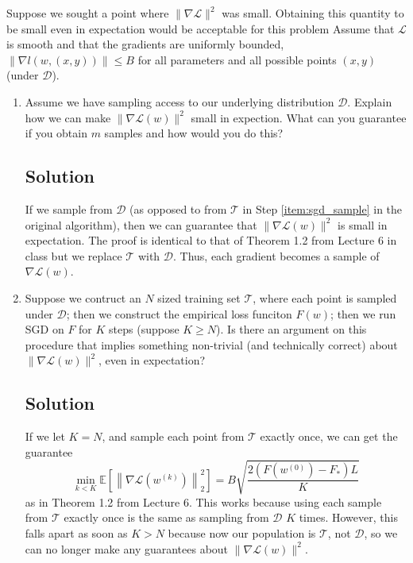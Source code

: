 \documentclass[letterpaper,11pt]{article}
\begin{document}
Suppose we sought a point where $\lVert \nabla \mathcal{L} \rVert^2$ was
small. Obtaining this quantity to be small even in expectation would be
acceptable for this problem Assume that $\mathcal{L}$ is smooth and that the
gradients are uniformly bounded,
$\lVert \nabla l\left(w, (x,y)\right)\rVert \leq B$ for all parameters and all
possible points $(x,y)$ (under $\mathcal{D}$).

\begin{enumerate}
\item Assume we have sampling access to our underlying distribution
  $\mathcal{D}$. Explain how we can make $\lVert \nabla \mathcal{L}(w) \rVert^2$
  small in expection. What can you guarantee if you obtain $m$ samples and how
  would you do this?

  \subsection*{Solution}

  If we sample from $\mathcal{D}$ (as opposed to from $\mathcal{T}$ in Step
  \ref{item:sgd_sample} in the original algorithm), then we can guarantee that
  $\lVert \nabla \mathcal{L}(w) \rVert^2$ is small in expectation. The proof is
  identical to that of Theorem 1.2 from Lecture 6 in class but we replace
  $\mathcal{T}$ with $\mathcal{D}$. Thus, each gradient becomes a sample of
  $\nabla\mathcal{L}(w)$.

  

\item Suppose we contruct an $N$ sized training set $\mathcal{T}$, where each
  point is sampled under $\mathcal{D}$; then we construct the empirical loss
  funciton $F(w)$; then we run SGD on $F$ for $K$ steps (suppose $K \geq N$). Is
  there an argument on this procedure that implies something non-trivial (and
  technically correct) about $\lVert \nabla\mathcal{L}(w)\rVert^2$, even in
  expectation?

  \subsection*{Solution}

  If we let $K = N$, and sample each point from $\mathcal{T}$ exactly once, we
  can get the guarantee
  \begin{equation}
    \min_{k < K}\mathbb{E}\left[
      \left\lVert \nabla\mathcal{L}\left(w^{(k)}\right)\right \rVert_2^2
    \right] = B\sqrt{\frac{2\left(F\left(w^{(0)}\right) - F_*\right)L}{K}}
  \end{equation}
  as in Theorem 1.2 from Lecture 6. This works because using each sample from
  $\mathcal{T}$ exactly once is the same as sampling from $\mathcal{D}$ $K$
  times. However, this falls apart as soon as $K > N$ because now our population
  is $\mathcal{T}$, not $\mathcal{D}$, so we can no longer make any guarantees
  about $\lVert \nabla\mathcal{L}(w)\rVert^2$.
\end{enumerate}
\end{document}
